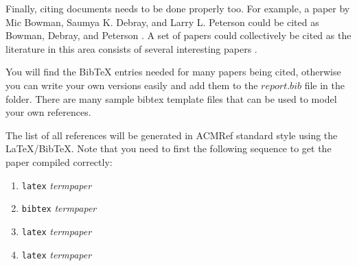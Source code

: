 \documentclass{sig-alternate}
\begin{document}
Finally, citing documents needs to be done properly too. For
example, a paper by Mic Bowman, Saumya K. Debray, and Larry
L. Peterson could be cited as Bowman, Debray, and Peterson
\cite{bowman:reasoning}. A set of papers could collectively
be cited as the literature in this area consists of several
interesting papers
\cite{braams:babel,clark:pct,herlihy:methodology}.

You will find the BibTeX entries needed for many papers being cited,
otherwise you can write your own versions easily and add them to the
$report.bib$ file in the folder. There are many sample bibtex
template files that can be used to model your own references.

The list of all references will be generated in ACMRef
standard style using the \LaTeX{}/BibTeX. Note that you
need to first the following sequence to get the paper
compiled correctly:

\begin{enumerate}
\item {\tt latex} {\em termpaper}
\item {\tt bibtex} {\em termpaper}
\item {\tt latex} {\em termpaper}
\item {\tt latex} {\em termpaper}
\end{enumerate}



\balance
\end{document}
